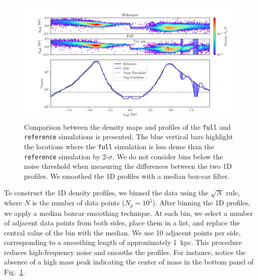         \begin{figure}
            \centering
            \includegraphics[width=\linewidth, trim=20 0 15 0]{images/monte-carlo-009-pouliasis2017pii-GCNBody-2000-milisigma-5-noisefactor-20-boxcarindexlength-shifted-0.png}
            \caption{Comparison between the density maps and profiles of the \texttt{full} and \texttt{reference} simulations is presented. The blue vertical bars highlight the locations where the \texttt{full} simulation is less dense than the \texttt{reference} simulation by 2-$\sigma$. We do not consider bins below the noise threshold when measuring the differences between the two 1D profiles. We smoothed the 1D profiles with a median box-car filter.}
            \label{fig:profiles}
        \end{figure}

        To construct the 1D density profiles, we binned the data using the $\sqrt{N}$ rule, where $N$ is the number of data points ($N_p = 10^5$). After binning the 1D profiles, we apply a median boxcar smoothing technique. At each bin, we select a number of adjacent data points from both sides, place them in a list, and replace the central value of the bin with the median. We use 10 adjacent points per side, corresponding to a smoothing length of approximately 1~kpc. This procedure reduces high-frequency noise and smooths the profiles. For instance, notice the absence of a high mass peak indicating the center of mass in the bottom panel of Fig.~\ref{fig:profiles}.

